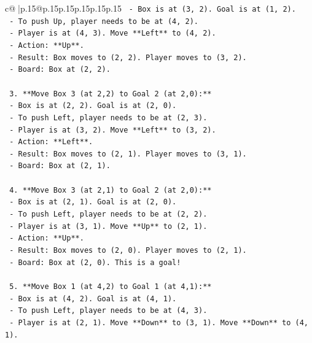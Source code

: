 \documentclass{article}
\begin{document}
{\begin{supertabular}{c@{$\;$}|p{.15\linewidth}@{}p{.15\linewidth}p{.15\linewidth}p{.15\linewidth}p{.15\linewidth}p{.15\linewidth}}
{{{\texttt{        {-} Box is at (3, 2). Goal is at (1, 2).} \\
\texttt{        {-} To push Up, player needs to be at (4, 2).} \\
\texttt{        {-} Player is at (4, 3). Move **Left** to (4, 2).} \\
\texttt{        {-} Action: **Up**.} \\
\texttt{        {-} Result: Box moves to (2, 2). Player moves to (3, 2).} \\
\texttt{        {-} Board: Box at (2, 2).} \\
\\ 
\texttt{    3.  **Move Box 3 (at 2,2) to Goal 2 (at 2,0):**} \\
\texttt{        {-} Box is at (2, 2). Goal is at (2, 0).} \\
\texttt{        {-} To push Left, player needs to be at (2, 3).} \\
\texttt{        {-} Player is at (3, 2). Move **Left** to (3, 2).} \\
\texttt{        {-} Action: **Left**.} \\
\texttt{        {-} Result: Box moves to (2, 1). Player moves to (3, 1).} \\
\texttt{        {-} Board: Box at (2, 1).} \\
\\ 
\texttt{    4.  **Move Box 3 (at 2,1) to Goal 2 (at 2,0):**} \\
\texttt{        {-} Box is at (2, 1). Goal is at (2, 0).} \\
\texttt{        {-} To push Left, player needs to be at (2, 2).} \\
\texttt{        {-} Player is at (3, 1). Move **Up** to (2, 1).} \\
\texttt{        {-} Action: **Up**.} \\
\texttt{        {-} Result: Box moves to (2, 0). Player moves to (2, 1).} \\
\texttt{        {-} Board: Box at (2, 0). This is a goal!} \\
\\ 
\texttt{    5.  **Move Box 1 (at 4,2) to Goal 1 (at 4,1):**} \\
\texttt{        {-} Box is at (4, 2). Goal is at (4, 1).} \\
\texttt{        {-} To push Left, player needs to be at (4, 3).} \\
\texttt{        {-} Player is at (2, 1). Move **Down** to (3, 1). Move **Down** to (4, 1).} \\
}}}
\end{supertabular}}
\end{document}
